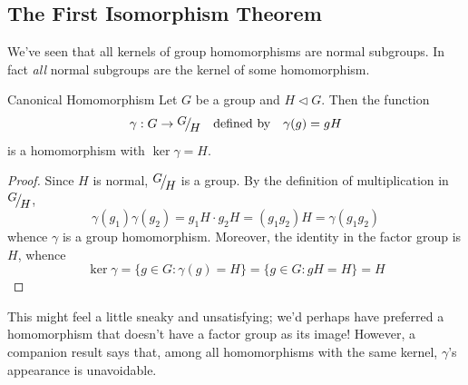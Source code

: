 \begin{exercises}
\begin{enumerate}
		
		
	\end{enumerate}

\end{exercises}






\subsection{The First Isomorphism Theorem}\label{sec:1stiso}

We've seen that all kernels of group homomorphisms are normal subgroups. In fact \emph{all} normal subgroups are the kernel of some homomorphism.

\begin{thm}{Canonical Homomorphism}{}
	Let $G$ be a group and $H\triangleleft G$. Then the function
	\[
		\gamma:G\to \quotient GH
		\quad\text{defined by}\quad 
		\gamma(g)=gH
	\]
	is a homomorphism with $\ker\gamma=H$.
\end{thm}

\begin{proof}
	Since $H$ is normal, $\quotient GH$ is a group. By the definition of multiplication in $\quotient GH$,
	\[
		\gamma(g_1)\gamma(g_2)
		=g_1H\cdot g_2H
		=(g_1g_2)H
		=\gamma(g_1g_2)
	\]
	whence $\gamma$ is a group homomorphism. Moreover, the identity in the factor group is $H$, whence
	\[
		\ker\gamma=\{g\in G:\gamma(g)=H\} 
		=\{g\in G:gH=H\}=H
		\tag*{\qedhere}
	\]
\end{proof}

This might feel a little sneaky and unsatisfying; we'd perhaps have preferred a homomorphism that doesn't have a factor group as its image! However, a companion result says that, among all homomorphisms with the same kernel, $\gamma$'s appearance is unavoidable.

